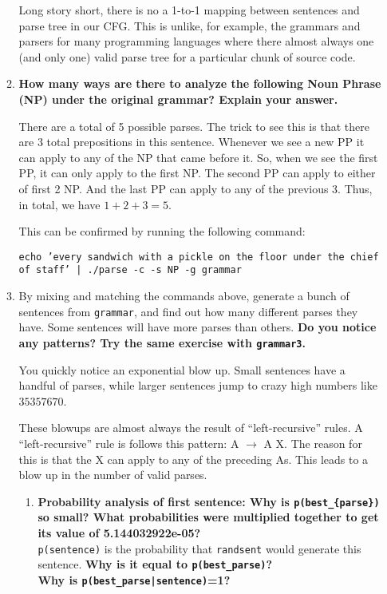\documentclass[10pt]{article}
\begin{document}
\begin{enumerate}
\begin{enumerate}
Long story short, there is no a 1-to-1 mapping between sentences and parse tree in our CFG. This is unlike, for example, the grammars and parsers for many programming languages where there almost always one (and only one) valid parse tree for a particular chunk of source code.

\item {\bf How many ways are there to analyze the following Noun Phrase (NP)
  under the original grammar?  Explain your answer.}

There are a total of 5 possible parses. The trick to see this is that there are 3 total prepositions in this sentence. Whenever we see a new PP it can apply to any of the NP that came before it. So, when we see the first PP, it can only apply to the first NP. The second PP can apply to either of first 2 NP. And the last PP can apply to any of the previous 3. Thus, in total, we have $1 + 2 + 3 = 5$.

This can be confirmed by running the following command:

{\tt echo 'every sandwich with a pickle on the floor under the chief of staff' | ./parse -c -s NP -g grammar}

\item By mixing and matching the commands above, generate a bunch of
  sentences from \verb|grammar|, and find out how many different parses they
  have. Some sentences will have more parses than others. {\bf Do you
  notice any patterns? Try the same exercise with \verb|grammar3|.}

You quickly notice an exponential blow up. Small sentences have a handful of parses, while larger sentences jump to crazy high numbers like $35357670$.

These blowups are almost always the result of ``left-recursive'' rules. A ``left-recursive'' rule is follows this pattern: A $\rightarrow$ A X. The reason for this is that the X can apply to any of the preceding As. This leads to a blow up in the number of valid parses.

\begin{enumerate} 
\item {\bf Probability analysis of first sentence: Why is \verb|p(best_{parse})| so small?  What probabilities were
  multiplied together to get its value of 5.144032922e-05?}\\
\noindent
\verb|p(sentence)| is the probability that \verb|randsent| would
  generate this sentence. {\bf Why is it equal to \verb|p(best_parse)|?}\\
\noindent
{\bf Why is \verb+p(best_parse|sentence)+=1?}


\end{enumerate}
\end{enumerate}
\end{enumerate}
\end{document}
